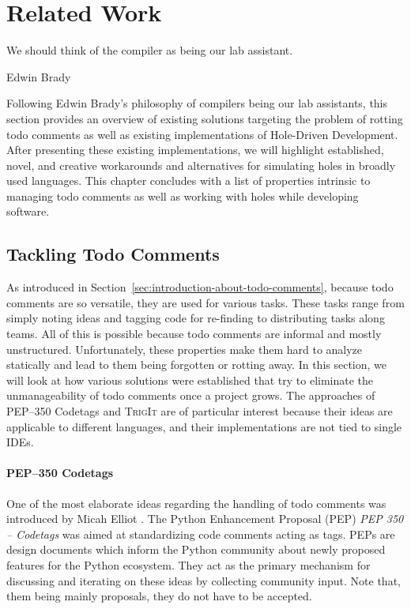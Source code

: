\chapter{Related Work}
\label{cha:related-work}
\epigraph{We should think of the compiler as being our lab assistant.}{Edwin Brady}

\noindent
Following Edwin Brady's philosophy of compilers being our lab assistants, this section provides an overview of existing solutions targeting the problem of rotting todo comments as well as existing implementations of Hole-Driven Development.
After presenting these existing implementations, we will highlight established, novel, and creative workarounds and alternatives for simulating holes in broadly used languages.
This chapter concludes with a list of properties intrinsic to managing todo comments as well as working with holes while developing software.

\section{Tackling Todo Comments}
\label{sec:tackling-todo-comments}
As introduced in Section~\ref{sec:introduction-about-todo-comments}, because todo comments are so versatile, they are used for various tasks.
These tasks range from simply noting ideas and tagging code for re-finding to distributing tasks along teams.
All of this is possible because todo comments are informal and mostly unstructured.
Unfortunately, these properties make them hard to analyze statically and lead to them being forgotten or rotting away.
In this section, we will look at how various solutions were established that try to eliminate the unmanageability of todo comments once a project grows.
The approaches of PEP--350 Codetags and \textsc{TrigIt} are of particular interest because their ideas are applicable to different languages, and their implementations are not tied to single IDEs.

\subsubsection{PEP--350 Codetags}
\label{sec:codetags}
One of the most elaborate ideas regarding the handling of todo comments was introduced by Micah Elliot \cite{elliott_pep_2005}.
The Python Enhancement Proposal (PEP) \emph{PEP 350 -- Codetags} was aimed at standardizing code comments acting as tags.
PEPs are design documents which inform the Python community about newly proposed features for the Python ecosystem.
They act as the primary mechanism for discussing and iterating on these ideas by collecting community input.
Note that, them being mainly proposals, they do not have to be accepted.

